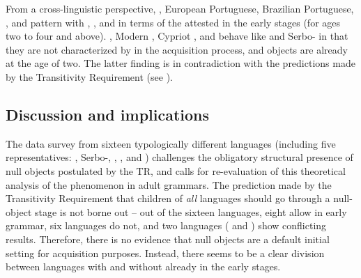 \documentclass[output=paper,modfonts,newtxmath,hidelinks,]{langscibook}
\begin{document}
From a cross-linguistic perspective, 
, 
European Portuguese, Brazilian Por\-tu\-guese, 
, and  pattern with , , and  in terms of the attested  in the early stages (for ages two to four and above). , Modern , Cypriot , and  behave like  and Serbo- in that they are not characterized by  in the acquisition process, and objects are  already at the age of two. The latter finding is in contradiction with the predictions made by the Transitivity Requirement (see ).

\subsection{Discussion and implications}\label{17:sec:key:3.3}

The data survey from sixteen typologically different languages (including five  representatives: , Serbo-, , , and ) challenges the obligatory structural presence of null objects postulated by the TR, and calls for re-evaluation of this theoretical analysis of the  phenomenon in adult grammars. The prediction made by the Transitivity Requirement that children of \textit{all} languages should go through a null-object stage is not borne out -- out of the sixteen languages, eight allow  in early grammar, six languages do not, and two languages ( and ) show conflicting results. Therefore, there is no evidence that null objects are a default initial setting for acquisition purposes. Instead, there seems to be a clear division between languages with and without  already in the early stages.
\end{document}
